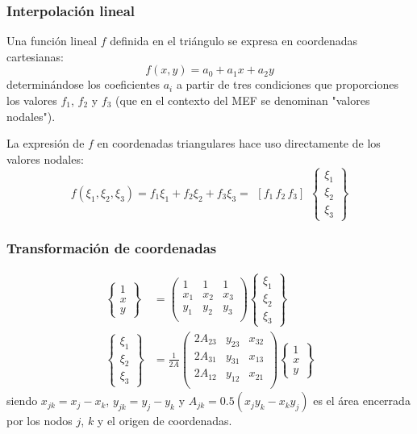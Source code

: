 \documentclass[10pt, aspectratio=43]{beamer}
\begin{document}
\begin{frame}
\frametitle{Interpolación lineal}
Una función lineal $f$ definida en el triángulo se expresa en coordenadas
cartesianas:
\begin{equation}
f(x,y)=a_0+a_1 x + a_2 y
\end{equation}
determinándose los coeficientes $a_i$ a partir de tres condiciones que
proporciones los valores $f_1$, $f_2$ y $f_3$ (que en el contexto del MEF se 
denominan "valores nodales").

La expresión de $f$ en coordenadas triangulares hace uso directamente de los
valores nodales:
\begin{equation}
f(\xi_1,\xi_2,\xi_3)=f_1 \xi_1+f_2 \xi_2+f_3 \xi_3=
\begin{array}{ccc}
\left[ f_1 \, f_2 \, f_3 \right]
\end{array}
\left\{ 
\begin{array}{c}
\xi_1 \\
\xi_2 \\
\xi_3 
\end{array}
\right\}
\end{equation}
\end{frame}
\begin{frame}
\frametitle{Transformación de coordenadas}
\begin{align}
\left\{
\begin{array}{c}
1 \\
x \\
y
\end{array}
\right\}
&=
\left(
\begin{array}{ccc}
1   & 1   & 1   \\
x_1 & x_2 & x_3 \\
y_1 & y_2 & y_3 \\
\end{array}
\right)
\left\{
\begin{array}{c}
\xi_1 \\
\xi_2 \\
\xi_3
\end{array}
\right\} \label{cstxxi} \\
\left\{
\begin{array}{c}
\xi_1 \\
\xi_2 \\
\xi_3
\end{array}
\right\}
&=\frac{1}{2A}
\left(
\begin{array}{ccc}
2A_{23} & y_{23} & x_{32} \\
2A_{31} & y_{31} & x_{13} \\
2A_{12} & y_{12} & x_{21} \\
\end{array}
\right)
\left\{
\begin{array}{c}
1 \\
x \\
y
\end{array}
\right\} \label{cstxix}
\end{align}
siendo $x_{jk}=x_j-x_k$, $y_{jk}=y_j-y_k$ y $A_{jk}=0.5(x_jy_k-x_ky_j)$ es el 
área encerrada por los nodos $j$, $k$ y el origen de coordenadas.
\end{frame}
\end{document}
